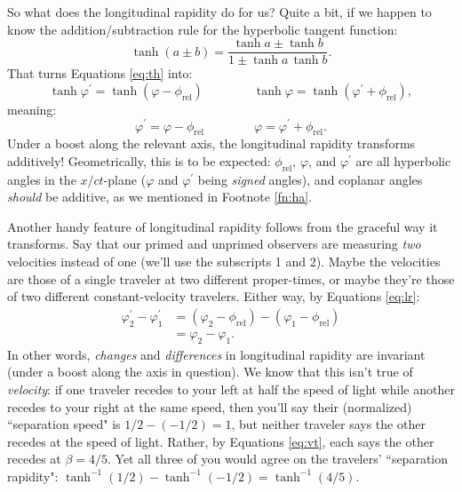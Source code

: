 \documentclass[12pt]{article}
\begin{document}
So what does the longitudinal rapidity do for us? Quite a bit, if we happen to know the addition/subtraction rule for the hyperbolic tangent function:
\begin{equation*}
\tanh{(a \pm b)} = \dfrac{\tanh{a} \pm \tanh{b}}{1 \pm \tanh{a} \, \tanh{b}}.
\end{equation*}
That turns Equations \ref{eq:th} into:
\begin{equation*}
\tanh{\varphi^{\prime}} = \tanh{(\varphi - \phi_{\textrm{rel}})} \qquad \qquad \tanh{\varphi} = \tanh{(\varphi^\prime + \phi_{\textrm{rel}})},
\end{equation*}
meaning:
\begin{equation}\label{eq:lr}
\varphi^\prime = \varphi - \phi_{\textrm{rel}} \qquad \qquad \varphi = \varphi^\prime + \phi_{\textrm{rel}}.
\end{equation}
Under a boost along the relevant axis, the longitudinal rapidity transforms additively! Geometrically, this is to be expected: $\phi_{\textrm{rel}}$, $\varphi$, and $\varphi^\prime$ are all hyperbolic angles in the $x/ct$-plane ($\varphi$ and $\varphi^{\prime}$ being \emph{signed} angles), and coplanar angles \emph{should} be additive, as we mentioned in Footnote \ref{fn:ha}.

Another handy feature of longitudinal rapidity follows from the graceful way it transforms. Say that our primed and unprimed observers are measuring \emph{two} velocities instead of one (we'll use the subscripts 1 and 2). Maybe the velocities are those of a single traveler at two different proper-times, or maybe they're those of two different constant-velocity travelers. Either way, by Equations \ref{eq:lr}:
\begin{equation*}
\begin{aligned}
\varphi_{2}^\prime - \varphi_{1}^\prime &= \left( \varphi_{2} - \phi_{\textrm{rel}} \right) - \left( \varphi_{1} - \phi_{\textrm{rel}} \right) \\[4pt]
&= \varphi_{2} - \varphi_{1}.
\end{aligned}
\end{equation*}
In other words, \emph{changes} and \emph{differences} in longitudinal rapidity are invariant (under a boost along the axis in question). We know that this isn't true of \emph{velocity}: if one traveler recedes to your left at half the speed of light while another recedes to your right at the same speed, then you'll say their (normalized) ``separation speed" is ${1/2 - (-1/2) = 1}$, but neither traveler says the other recedes at the speed of light. Rather, by Equations \ref{eq:vt}, each says the other recedes at $\beta = 4/5$. Yet all three of you would agree on the travelers' ``separation rapidity": $\tanh^{-1}(1/2) - \tanh^{-1}(-1/2) = \tanh^{-1}(4/5)$.
\end{document}

